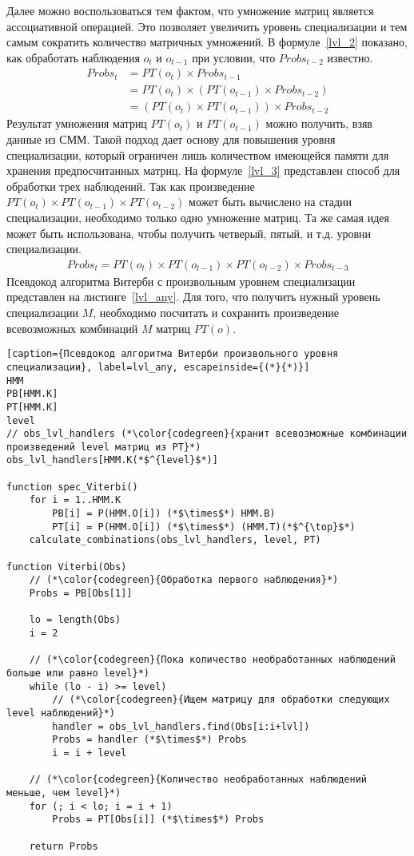 Далее можно воспользоваться тем фактом, что умножение матриц 
является ассоциативной операцией.
Это позволяет увеличить уровень специализации и тем самым 
сократить количество матричных умножений.
В формуле~\ref{lvl_2} показано, как обработать наблюдения $o_{t}$ и $o_{t-1}$ при условии, 
что $Probs_{t-2}$ известно.
\begin{align}
  \mathit{Probs}_{t} &= \mathit{PT}(\mathit{o}_{t}) \times \mathit{Probs}_{t-1}\nonumber\\
  &= \mathit{PT}(\mathit{o}_{t}) \times (\mathit{PT}(\mathit{o}_{t-1}) \times \mathit{Probs}_{t-2}) \nonumber\\
  & =(\mathit{PT}(\mathit{o}_{t}) \times \mathit{PT}(\mathit{o}_{t-1})) \times \mathit{Probs}_{t-2}
\label{lvl_2}
\end{align}
Результат умножения матриц $PT(o_t)$ и $PT(o_{t-1})$
можно получить, взяв данные из СММ.
Такой подход дает основу для повышения уровня специализации, 
который ограничен лишь количеством имеющейся памяти для хранения предпосчитанных матриц.
На формуле~\ref{lvl_3} представлен способ для обработки трех 
наблюдений.
Так как произведение $\mathit{PT}(o_t) \times \mathit{PT}(o_{t-1}) \times \mathit{PT}(o_{t-2})$
может быть вычислено на стадии специализации, необходимо 
только одно умножение матриц.
Та же самая идея может быть использована, чтобы получить 
четверый, пятый, и т.д. уровни специализации.
\begin{align}
  \mathit{Probs}_{t} = \mathit{PT}(o_t) \times \mathit{PT}(o_{t-1}) \times \mathit{PT}(o_{t-2}) \times \mathit{Probs}_{t - 3} 
\label{lvl_3}
\end{align}
Псевдокод алгоритма Витерби с произвольным уровнем 
специализации представлен на листинге~\ref{lvl_any}.
Для того, что получить нужный уровень специализации $M$, 
необходимо посчитать и сохранить произведение всевозможных 
комбинаций $M$ матриц $PT(o)$.
\begin{lstlisting}[caption={Псевдокод алгоритма Витерби произвольного уровня специализации}, label=lvl_any, escapeinside={(*}{*)}]
HMM
PB[HMM.K]
PT[HMM.K]
level
// obs_lvl_handlers (*\color{codegreen}{хранит всевозможные комбинации произведений level матриц из PT}*)
obs_lvl_handlers[HMM.K(*$^{level}$*)]

function spec_Viterbi()
	for i = 1..HMM.K
		PB[i] = P(HMM.O[i]) (*$\times$*) HMM.B)
		PT[i] = P(HMM.O[i]) (*$\times$*) (HMM.T)(*$^{\top}$*)
	calculate_combinations(obs_lvl_handlers, level, PT)

function Viterbi(Obs)
	// (*\color{codegreen}{Обработка первого наблюдения}*)
	Probs = PB[Obs[1]]

	lo = length(Obs)
	i = 2

	// (*\color{codegreen}{Пока количество необработанных наблюдений больше или равно level}*)
	while (lo - i) >= level)
		// (*\color{codegreen}{Ищем матрицу для обработки следующих level наблюдений}*)
		handler = obs_lvl_handlers.find(Obs[i:i+lvl])
		Probs = handler (*$\times$*) Probs
		i = i + level
	
	// (*\color{codegreen}{Количество необработанных наблюдений меньше, чем level}*)
	for (; i < lo; i = i + 1)
		Probs = PT[Obs[i]] (*$\times$*) Probs

	return Probs
\end{lstlisting}

